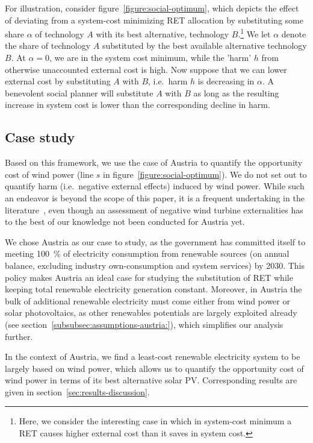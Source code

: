\documentclass[review, 3p, times]{elsarticle} %
\begin{document}
    For illustration, consider figure~\ref{figure:social-optimum}, which depicts the effect of deviating from a
    system-cost minimizing RET allocation by substituting some share $\alpha$ of technology $A$ with its best alternative,
    technology $B$.\footnote{Here, we consider the interesting case in which in system-cost minimum a RET causes higher
    external cost than it saves in system cost.}
    We let $\alpha$ denote the share of technology $A$ substituted by the best available alternative technology $B$.
    At $\alpha=0$, we are in the system cost minimum, while the 'harm' $h$ from otherwise unaccounted external cost is
    high.
    Now suppose that we can lower external cost by substituting $A$ with $B$, i.e.\ harm $h$ is decreasing in $\alpha$.
    A benevolent social planner will substitute $A$ with $B$ as long as the resulting increase in system cost is lower
    than the corresponding decline in harm.

    \subsection{Case study}
    Based on this framework, we use the case of Austria to quantify the opportunity cost of wind power (line $s$ in
    figure~\ref{figure:social-optimum}).
    We do not set out to quantify harm (i.e.\ negative external effects) induced by wind power.
    While such an endeavor is beyond the scope of this paper, it is a frequent undertaking in the
    literature~\citep[e.g.][]{Droees2016, Gibbons2015, Heintzelmann2017, Jensen2018, Kussel2019, Lang2014, Sims2008, Sunak2016, Vyn2014},
    even though an assessment of negative wind turbine externalities has to the best of our knowledge not been conducted
    for Austria yet.

    We chose Austria as our case to study, as the government has committed itself to meeting \SI{100}{\percent} of
    electricity consumption from renewable sources (on annual balance, excluding industry own-consumption and system
    services) by 2030.
    This policy makes Austria an ideal case for studying the substitution of RET while keeping total renewable
    electricity generation constant.
    Moreover, in Austria the bulk of additional renewable electricity must come either from wind power or solar
    photovoltaics, as other renewables potentials are largely exploited already (see
    section~\ref{subsubsec:assumptions-austria:}), which simplifies our analysis further.

    In the context of Austria, we find a least-cost renewable electricity system to be largely based on wind power,
    which allows us to quantify the opportunity cost of wind power in terms of its best alternative solar PV.
    Corresponding results are given in section~\ref{sec:results-discussion}.
\end{document}
